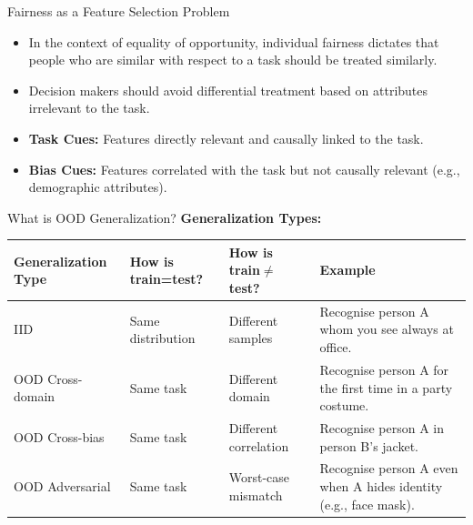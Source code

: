 \documentclass[aspectratio=169]{beamer}
\begin{document}
\begin{frame}{Fairness as a Feature Selection Problem}
    \begin{itemize}
        \item In the context of equality of opportunity, individual fairness dictates that people who are similar with respect to a task should be treated similarly.
        \item Decision makers should avoid differential treatment based on attributes irrelevant to the task.
        \item \textbf{Task Cues:} Features directly relevant and causally linked to the task.
        \item \textbf{Bias Cues:} Features correlated with the task but not causally relevant (e.g., demographic attributes).
    \end{itemize}

\end{frame}

\begin{frame}{What is OOD Generalization?}
    \textbf{Generalization Types:}
    \begin{table}[]
        \centering
        \setlength{\tabcolsep}{3pt}
        \renewcommand{\arraystretch}{0.9}
        \begin{tabular}{l l l p{4.3cm}}
            \toprule
            \textbf{Generalization Type} & \textbf{How is train=test?} & \textbf{How is train$\neq$test?} & \textbf{Example} \\
            \midrule
            IID & Same distribution & Different samples & Recognise person A whom you see always at office. \\
            OOD Cross-domain & Same task & Different domain & Recognise person A for the first time in a party costume. \\
            OOD Cross-bias & Same task & Different correlation & Recognise person A in person B's jacket. \\
            OOD Adversarial & Same task & Worst-case mismatch & Recognise person A even when A hides identity (e.g., face mask). \\
            \bottomrule
        \end{tabular}
    \end{table}
\end{frame}
\end{document}
